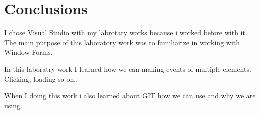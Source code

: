 \section*{Conclusions}


I chose Visual Studio with my labrotary works because i worked before with it. 
The main purpose of this laboratory work was to familiarize in working with Window Forms.

In this laboratry work I learned how we can making events of multiple elements. Clicking, loading so on..

When I doing this work i also learned about GIT how we can use and why we are using.

\clearpage